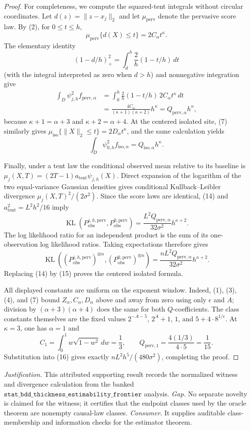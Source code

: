 \documentclass{article}
\begin{document}
\begin{proof}
For completeness, we compute the squared-tent integrals without circular
coordinates.  Let \(d(z)=\|z-x_j\|_2\) and let \(\mu_{\mathrm{perv}}\) denote
the pervasive score law.  By (2), for \(0\leq t\leq h\),
\[
 \mu_{\mathrm{perv}}\{d(X)\leq t\}=2C_\alpha t^\kappa.
\]
The elementary identity
\[
 (1-d/h)_+^2=\int_d^h\frac2h(1-t/h)\,dt
\]
(with the integral interpreted as zero when \(d>h\)) and nonnegative
integration give
\[
\begin{aligned}
 \int_D\psi_{j,h}^2 f_{\mathrm{perv},\alpha}
 &=\int_0^h\frac2h(1-t/h)\,2C_\alpha t^\kappa\,dt\\
 &=\frac{4C_\alpha}{(\kappa+1)(\kappa+2)}h^\kappa
 =Q_{\mathrm{perv},\alpha}h^\kappa,
\end{aligned}
 \tag{14}
\]
because \(\kappa+1=\alpha+3\) and \(\kappa+2=\alpha+4\).  At the centered
isolated site, (7) similarly gives
\(\mu_{\mathrm{iso}}\{\|X\|_2\leq t\}=2D_\alpha t^\kappa\), and the same
calculation yields
\[
 \int_D\psi_{0,h}^2 f_{\mathrm{iso},\alpha}
 =Q_{\mathrm{iso},\alpha}h^\kappa.
 \tag{15}
\]

Finally, under a tent law the conditional observed mean relative to its baseline
is \(\mu_j(X,T)=(2T-1)a_{\mathrm{tent}}\psi_{j,h}(X)\).  Direct expansion of
the logarithm of the two equal-variance Gaussian densities gives conditional
Kullback--Leibler divergence \(\mu_j(X,T)^2/(2\sigma^2)\).  Since the score laws
are identical, (14) and \(a_{\mathrm{tent}}^2=L^2h^2/16\) imply
\[
 \operatorname{KL}(P^{j,h,\mathrm{perv}}_{\mathrm{obs}},
                    P^{0,\mathrm{perv}}_{\mathrm{obs}})
 =\frac{L^2Q_{\mathrm{perv},\alpha}}{32\sigma^2}h^{\kappa+2}.
\]
The log likelihood ratio for an independent product is the sum of its
one-observation log likelihood ratios.  Taking expectations therefore gives
\[
 \operatorname{KL}\!\left((P^{j,h,\mathrm{perv}}_{\mathrm{obs}})^{\otimes n},
 (P^{0,\mathrm{perv}}_{\mathrm{obs}})^{\otimes n}\right)
 =\frac{nL^2Q_{\mathrm{perv},\alpha}}{32\sigma^2}h^{\kappa+2}.
 \tag{16}
\]
Replacing (14) by (15) proves the centered isolated formula.

All displayed constants are uniform on the exponent window.  Indeed, (1),
(3), (4), and (7) bound \(Z_\alpha,C_\alpha,D_\alpha\) above and away from zero
using only \(\epsilon\) and \(A\); division by
\((\alpha+3)(\alpha+4)\) does the same for both \(Q\)-coefficients.  The class
constants themselves are the fixed values \(2^{-A-5}\), \(2^A+1\), \(1\), and
\(5+4\cdot8^{1/\epsilon}\).  At \(\kappa=3\), one has \(\alpha=1\) and
\[
 C_1=\int_0^1w\sqrt{1-w^2}\,dw=\frac13,
 \qquad Q_{\mathrm{perv},1}=\frac{4(1/3)}{4\cdot5}=\frac1{15}.
\]
Substitution into (16) gives exactly
\(nL^2h^5/(480\sigma^2)\), completing the proof.
\end{proof}
\par\smallskip\noindent \textit{Justification.} This attributed supporting result records the normalized witness and divergence calculation from the banked \(\texttt{stat\_bdd\_thickness\_estimability\_frontier}\) analysis. \textit{Gap.} No separate novelty is claimed for the witness; it certifies that the endpoint classes used by the oracle theorem are nonempty causal-law classes. \textit{Consumer.} It supplies auditable class-membership and information checks for the estimator theorem.
\end{document}
